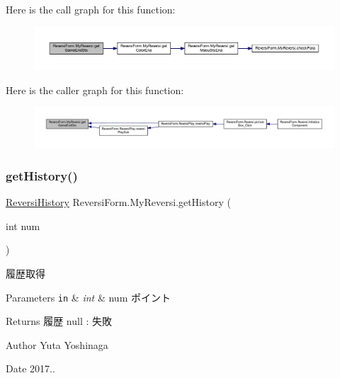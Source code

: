 Here is the call graph for this function\+:\nopagebreak
\begin{figure}[H]
\begin{center}
\leavevmode
\includegraphics[width=350pt]{class_reversi_form_1_1_my_reversi_aa39c8c111afeb4ea3bf2befbd9f1434b_cgraph}
\end{center}
\end{figure}
Here is the caller graph for this function\+:\nopagebreak
\begin{figure}[H]
\begin{center}
\leavevmode
\includegraphics[width=350pt]{class_reversi_form_1_1_my_reversi_aa39c8c111afeb4ea3bf2befbd9f1434b_icgraph}
\end{center}
\end{figure}
\mbox{\label{class_reversi_form_1_1_my_reversi_a249dba624bda1144c23cc53f68c35c67}} 
\subsubsection{\texorpdfstring{get\+History()}{getHistory()}}
{\footnotesize\ttfamily \hyperlink{class_reversi_form_1_1_reversi_history}{Reversi\+History} Reversi\+Form.\+My\+Reversi.\+get\+History (\begin{DoxyParamCaption}\item[{int}]{num }\end{DoxyParamCaption})}



履歴取得 


\begin{DoxyParams}[1]{Parameters}
\mbox{\tt in}  & {\em int} & num ポイント \\
\hline
\end{DoxyParams}
\begin{DoxyReturn}{Returns}
履歴 null \+: 失敗 
\end{DoxyReturn}
\begin{DoxyAuthor}{Author}
Yuta Yoshinaga 
\end{DoxyAuthor}
\begin{DoxyDate}{Date}
2017.. 
\end{DoxyDate}


